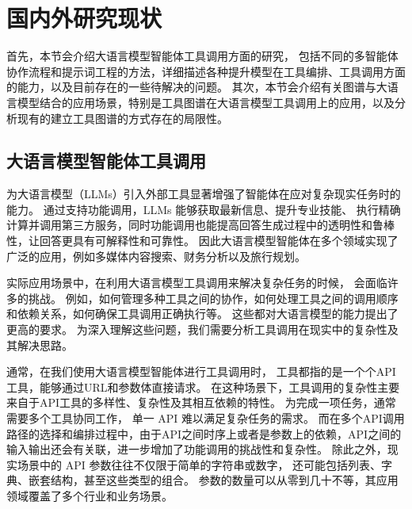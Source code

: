 \section{国内外研究现状}



首先，本节会介绍大语言模型智能体工具调用方面的研究，
包括不同的多智能体协作流程和提示词工程的方法，详细描述各种提升模型在工具编排、工具调用方面的能力，以及目前存在的一些待解决的问题。
其次，本节会介绍有关图谱与大语言模型结合的应用场景，特别是工具图谱在大语言模型工具调用上的应用，以及分析现有的建立工具图谱的方式存在的局限性。

\subsection{大语言模型智能体工具调用}

为大语言模型（LLMs）引入外部工具显著增强了智能体在应对复杂现实任务时的能力\cite{huang2024planning, Qin2023, qu2024tool}。
通过支持功能调用，LLMs 能够获取最新信息、提升专业技能、
执行精确计算并调用第三方服务，同时功能调用也能提高回答生成过程中的透明性和鲁棒性，让回答更具有可解释性和可靠性。
因此大语言模型智能体在多个领域实现了广泛的应用，例如多媒体内容搜索\cite{Song2023}、财务分析\cite{theuma2024equipping}以及旅行规划\cite{hao2024large}。

实际应用场景中，在利用大语言模型工具调用来解决复杂任务的时候，
会面临许多的挑战。
例如，如何管理多种工具之间的协作，如何处理工具之间的调用顺序和依赖关系，如何确保工具调用正确执行等。
这些都对大语言模型的能力提出了更高的要求\cite{huang2024planning, Qin2023}。
为深入理解这些问题，我们需要分析工具调用在现实中的复杂性及其解决思路。

通常，在我们使用大语言模型智能体进行工具调用时，
工具都指的是一个个API工具，能够通过URL和参数体直接请求。
在这种场景下，工具调用的复杂性主要来自于API工具的多样性、复杂性及其相互依赖的特性\cite{Qin2023}。
为完成一项任务，通常需要多个工具协同工作，
单一 API 难以满足复杂任务的需求\cite{huang2024planning}。
而在多个API调用路径的选择和编排过程中，由于API之间时序上或者是参数上的依赖，API之间的输入输出还会有关联，进一步增加了功能调用的挑战性和复杂性。
除此之外，现实场景中的 API 参数往往不仅限于简单的字符串或数字，
还可能包括列表、字典、嵌套结构，甚至这些类型的组合。
参数的数量可以从零到几十不等，其应用领域覆盖了多个行业和业务场景\cite{ye2024tooleyes}。


